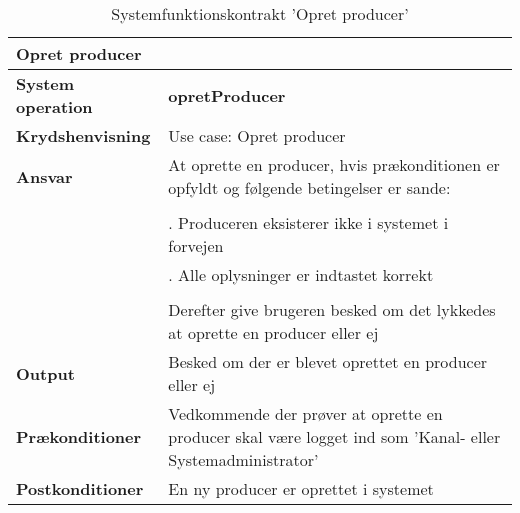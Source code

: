 \begin{table}[ht]
    \begin{tabularx}{\textwidth}{|p{4cm}|X|}
        \hline
        \multicolumn{2}{|X|}{\textbf{Opret producer}}\\
        \hline
        \textbf{System operation}       & \textbf{opretProducer} \\ \hline
        \textbf{Krydshenvisning}        & Use case: Opret producer \\ \hline\textbf{}
        \textbf{Ansvar}                 & At oprette en producer, hvis prækonditionen er opfyldt og følgende betingelser er sande: \\ 
                                        & \\ 
                                        & \quad 1. Produceren eksisterer ikke i systemet i forvejen \\
                                        & \quad 2. Alle oplysninger er indtastet korrekt \\
                                        & \\
                                        & Derefter give brugeren besked om det lykkedes at oprette en producer eller ej \\\hline
        \textbf{Output}                 & Besked om der er blevet oprettet en producer eller ej \\ \hline
        \textbf{Prækonditioner}         & Vedkommende der prøver at oprette en producer skal være logget ind som 'Kanal- eller                                                  Systemadministrator' \\ \hline
        \textbf{Postkonditioner}        & En ny producer er oprettet i systemet \\ \hline
    \end{tabularx}
    \caption{Systemfunktionskontrakt 'Opret producer'}
    \label{tab:kontrakter_opret_producer}
\end{table}


